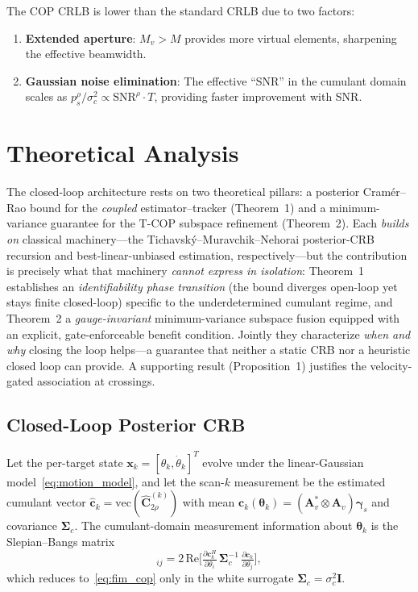 \documentclass[journal]{IEEEtran}
\newcommand{\vect}[1]{\boldsymbol{#1}}
\newcommand{\mat}[1]{\mathbf{#1}}
\newcommand{\Real}{\mathrm{Re}}
\begin{document}
The COP CRLB is lower than the standard CRLB due to two factors:
\begin{enumerate}
\item \textbf{Extended aperture}: $M_v > M$ provides more virtual elements, sharpening the effective beamwidth.
\item \textbf{Gaussian noise elimination}: The effective ``SNR'' in the cumulant domain scales as $p_s^\rho / \sigma_c^2 \propto \mathrm{SNR}^\rho \cdot T$, providing faster improvement with SNR.
\end{enumerate}

\section{Theoretical Analysis}
\label{sec:theory}

The closed-loop architecture rests on two theoretical pillars: a posterior Cram\'{e}r--Rao bound for the \emph{coupled} estimator--tracker (Theorem~1) and a minimum-variance guarantee for the T-COP subspace refinement (Theorem~2). Each \emph{builds on} classical machinery---the Tichavsk\'{y}--Muravchik--Nehorai posterior-CRB recursion and best-linear-unbiased estimation, respectively---but the contribution is precisely what that machinery \emph{cannot express in isolation}: Theorem~1 establishes an \emph{identifiability phase transition} (the bound diverges open-loop yet stays finite closed-loop) specific to the underdetermined cumulant regime, and Theorem~2 a \emph{gauge-invariant} minimum-variance subspace fusion equipped with an explicit, gate-enforceable benefit condition. Jointly they characterize \emph{when and why} closing the loop helps---a guarantee that neither a static CRB nor a heuristic closed loop can provide. A supporting result (Proposition~1) justifies the velocity-gated association at crossings.

\subsection{Closed-Loop Posterior CRB}
\label{sec:pcrb}

Let the per-target state $\mat{x}_k = [\theta_k, \dot{\theta}_k]^T$ evolve under the linear-Gaussian model~\eqref{eq:motion_model}, and let the scan-$k$ measurement be the estimated cumulant vector $\hat{\mat{c}}_k = \mathrm{vec}(\hat{\mat{C}}_{2\rho}^{(k)})$ with mean $\mat{c}_k(\vect{\theta}_k) = (\mat{A}_v^* \otimes \mat{A}_v)\vect{\gamma}_s$ and covariance $\mat{\Sigma}_c$. The cumulant-domain measurement information about $\vect{\theta}_k$ is the Slepian--Bangs matrix
\begin{equation}
[\mat{J}_k^Z]_{ij} = 2\,\Real\!\Big[\tfrac{\partial \mat{c}_k^H}{\partial\theta_i}\,\mat{\Sigma}_c^{-1}\,\tfrac{\partial \mat{c}_k}{\partial\theta_j}\Big],
\label{eq:meas_fim}
\end{equation}
which reduces to~\eqref{eq:fim_cop} only in the white surrogate $\mat{\Sigma}_c = \sigma_c^2\mat{I}$.
\end{document}
